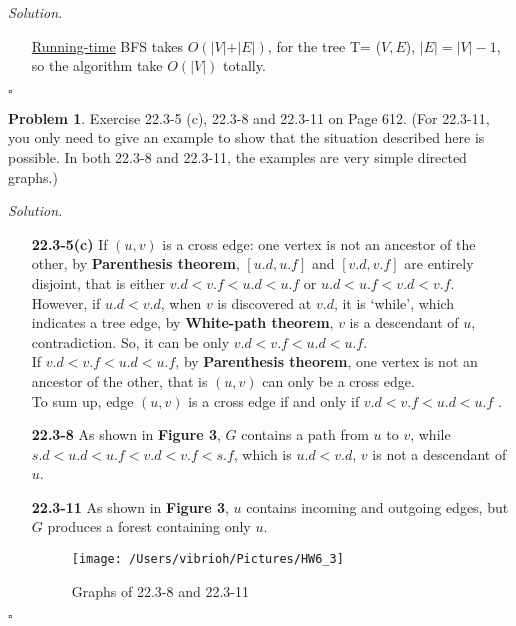 \documentclass[11pt]{article}
\theoremstyle{definition}
\newtheorem{problem}{Problem}
\newenvironment{solution}{\noindent\emph{Solution.}}{\hfill$\square$}
\newcommand\tab[1][1cm]{\hspace*{#1}}
\begin{document}
\begin{solution}
\begin{enumerate}
 \item[\underline{Running-time}] BFS takes $O(\vert V \vert + \vert E \vert)$, for the tree T= ($V, E$), $\vert E \vert = \vert V \vert - 1$, so the algorithm take $O(\vert V \vert)$ totally.

   
   
  \end{enumerate}
\end{solution}

\clearpage






\begin{problem}
Exercise 22.3-5 (c), 22.3-8 and 22.3-11 on Page 612. (For 22.3-11, you only need to give an example to show that the situation described here is possible. In both 22.3-8 and 22.3-11, the examples are very simple directed graphs.)
\end{problem}

\begin{solution}
\begin{enumerate}

 \item[\textbf{22.3-5(c)}] \tab If $(u,v)$ is a cross edge: one vertex is not an ancestor of the other, by \textbf{Parenthesis theorem}, $[u.d, u.f]$ and $[v.d, v.f]$ are entirely disjoint, that is either $v.d<v.f<u.d<u.f$ or $u.d<u.f<v.d<v.f$. However, if $u.d<v.d$, when $v$ is discovered at $v.d$, it is `while', which indicates a tree edge, by \textbf{White-path theorem}, $v$ is a descendant of $u$, contradiction. So, it can be only $v.d<v.f<u.d<u.f$.\\
 \tab If $v.d<v.f<u.d<u.f$, by \textbf{Parenthesis theorem}, one vertex is not an ancestor of the other, that is $(u,v)$ can only be a cross edge.\\
\tab To sum up, edge $(u,v)$ is a cross edge if and only if $v.d<v.f<u.d<u.f$ .

 \item[\textbf{22.3-8}] 
    \tab As shown in \textbf{Figure 3}, $G$ contains a path from $u$ to $v$, while $s.d<u.d<u.f<v.d<v.f<s.f$, which is $u.d<v.d$, $v$ is not a descendant of $u$.
    
     \item[\textbf{22.3-11}] 
    \tab As shown in \textbf{Figure 3}, $u$ contains incoming and outgoing edges, but $G$ produces a forest containing only $u$.\\
    
        \begin{figure}[htbp]
  \centering
  \texttt{[image: /Users/vibrioh/Pictures/HW6\_3]}
  \caption{Graphs of 22.3-8 and 22.3-11}
  \label{fig:shapes}
\end{figure}
    
\end{enumerate}

\end{solution} 
\end{document}
